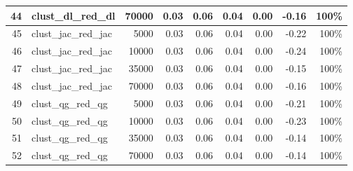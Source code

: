 \documentclass{praca1}
\begin{document}
\begin{table}[!h]
\begin{tabular}{|rlr|rrr|rr|r|}
  44 & clust\_dl\_red\_dl & 70000 & 0.03 & 0.06 & 0.04 & 0.00 & -0.16 & 100\% \\ 
   \hline
45 & clust\_jac\_red\_jac & 5000 & 0.03 & 0.06 & 0.04 & 0.00 & -0.22 & 100\% \\ 
  46 & clust\_jac\_red\_jac & 10000 & 0.03 & 0.06 & 0.04 & 0.00 & -0.24 & 100\% \\ 
  47 & clust\_jac\_red\_jac & 35000 & 0.03 & 0.06 & 0.04 & 0.00 & -0.15 & 100\% \\ 
  48 & clust\_jac\_red\_jac & 70000 & 0.03 & 0.06 & 0.04 & 0.00 & -0.16 & 100\% \\ 
   \hline
49 & clust\_qg\_red\_qg & 5000 & 0.03 & 0.06 & 0.04 & 0.00 & -0.21 & 100\% \\ 
  50 & clust\_qg\_red\_qg & 10000 & 0.03 & 0.06 & 0.04 & 0.00 & -0.23 & 100\% \\ 
  51 & clust\_qg\_red\_qg & 35000 & 0.03 & 0.06 & 0.04 & 0.00 & -0.14 & 100\% \\ 
  52 & clust\_qg\_red\_qg & 70000 & 0.03 & 0.06 & 0.04 & 0.00 & -0.14 & 100\% \\ 
   \hline
\end{tabular}
\end{table}
\end{document}
